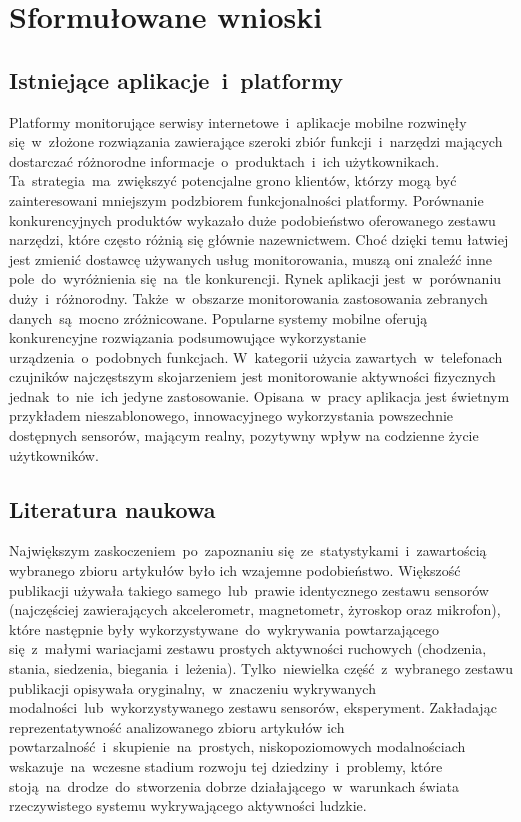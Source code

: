 \section{Sformułowane wnioski}

\subsection{Istniejące aplikacje~i~platformy}
Platformy monitorujące serwisy internetowe~i~aplikacje mobilne rozwinęły się~w~złożone rozwiązania zawierające szeroki zbiór funkcji~i~narzędzi mających dostarczać różnorodne informacje~o~produktach~i~ich użytkownikach. Ta~strategia~ma~zwiększyć potencjalne grono klientów, którzy mogą być zainteresowani mniejszym podzbiorem funkcjonalności platformy. Porównanie konkurencyjnych produktów wykazało duże podobieństwo oferowanego zestawu narzędzi, które często różnią się głównie nazewnictwem. Choć dzięki temu łatwiej jest zmienić dostawcę używanych usług monitorowania, muszą oni znaleźć inne pole~do~wyróżnienia się~na~tle konkurencji. Rynek aplikacji jest~w~porównaniu duży~i~różnorodny. Także~w~obszarze monitorowania zastosowania zebranych danych~są~mocno zróżnicowane. Popularne systemy mobilne oferują konkurencyjne rozwiązania podsumowujące wykorzystanie urządzenia~o~podobnych funkcjach. W~kategorii użycia zawartych~w~telefonach czujników najczęstszym skojarzeniem jest monitorowanie aktywności fizycznych jednak~to~nie~ich jedyne zastosowanie. Opisana~w~pracy aplikacja  jest świetnym przykładem nieszablonowego, innowacyjnego wykorzystania powszechnie dostępnych sensorów, mającym realny, pozytywny wpływ na codzienne życie użytkowników.

\subsection{Literatura naukowa}
Największym zaskoczeniem~po~zapoznaniu się~ze~statystykami~i~zawartością wybranego zbioru artykułów było ich wzajemne podobieństwo. Większość publikacji używała takiego samego~lub~prawie identycznego zestawu sensorów (najczęściej zawierających akcelerometr, magnetometr, żyroskop oraz mikrofon), które następnie były wykorzystywane~do~wykrywania powtarzającego się~z~małymi wariacjami zestawu prostych aktywności ruchowych (chodzenia, stania, siedzenia, biegania~i~leżenia). Tylko~niewielka część~z~wybranego zestawu publikacji opisywała oryginalny,~w~znaczeniu wykrywanych modalności~lub~wykorzystywanego zestawu sensorów, eksperyment. Zakładając reprezentatywność analizowanego zbioru artykułów ich powtarzalność~i~skupienie~na~prostych, niskopoziomowych modalnościach wskazuje~na~wczesne stadium rozwoju tej dziedziny~i~problemy, które stoją~na~drodze~do~stworzenia dobrze działającego~w~warunkach świata rzeczywistego systemu wykrywającego aktywności ludzkie.

